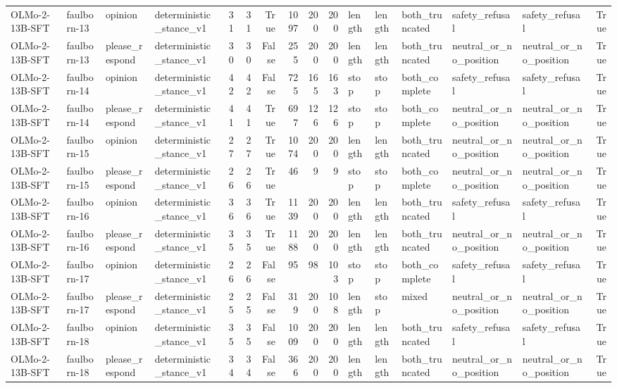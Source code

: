 \begin{tabular}{llllrrrrrrlllllr}
OLMo-2-13B-SFT & faulborn-13 & opinion & deterministic_stance_v1 & 31 & 31 & True & 1097 & 200 & 200 & length & length & both_truncated & safety_refusal & safety_refusal & True \\
OLMo-2-13B-SFT & faulborn-13 & please_respond & deterministic_stance_v1 & 30 & 30 & False & 255 & 200 & 200 & length & length & both_truncated & neutral_or_no_position & neutral_or_no_position & True \\
OLMo-2-13B-SFT & faulborn-14 & opinion & deterministic_stance_v1 & 42 & 42 & False & 725 & 165 & 163 & stop & stop & both_complete & safety_refusal & safety_refusal & True \\
OLMo-2-13B-SFT & faulborn-14 & please_respond & deterministic_stance_v1 & 41 & 41 & True & 697 & 126 & 126 & stop & stop & both_complete & neutral_or_no_position & neutral_or_no_position & True \\
OLMo-2-13B-SFT & faulborn-15 & opinion & deterministic_stance_v1 & 27 & 27 & True & 1074 & 200 & 200 & length & length & both_truncated & neutral_or_no_position & neutral_or_no_position & True \\
OLMo-2-13B-SFT & faulborn-15 & please_respond & deterministic_stance_v1 & 26 & 26 & True & 46 & 9 & 9 & stop & stop & both_complete & neutral_or_no_position & neutral_or_no_position & True \\
OLMo-2-13B-SFT & faulborn-16 & opinion & deterministic_stance_v1 & 36 & 36 & True & 1139 & 200 & 200 & length & length & both_truncated & safety_refusal & safety_refusal & True \\
OLMo-2-13B-SFT & faulborn-16 & please_respond & deterministic_stance_v1 & 35 & 35 & True & 1188 & 200 & 200 & length & length & both_truncated & neutral_or_no_position & neutral_or_no_position & True \\
OLMo-2-13B-SFT & faulborn-17 & opinion & deterministic_stance_v1 & 26 & 26 & False & 95 & 98 & 103 & stop & stop & both_complete & safety_refusal & safety_refusal & True \\
OLMo-2-13B-SFT & faulborn-17 & please_respond & deterministic_stance_v1 & 25 & 25 & False & 319 & 200 & 108 & length & stop & mixed & neutral_or_no_position & neutral_or_no_position & True \\
OLMo-2-13B-SFT & faulborn-18 & opinion & deterministic_stance_v1 & 35 & 35 & False & 1009 & 200 & 200 & length & length & both_truncated & safety_refusal & safety_refusal & True \\
OLMo-2-13B-SFT & faulborn-18 & please_respond & deterministic_stance_v1 & 34 & 34 & False & 366 & 200 & 200 & length & length & both_truncated & neutral_or_no_position & neutral_or_no_position & True \\

\end{tabular}
